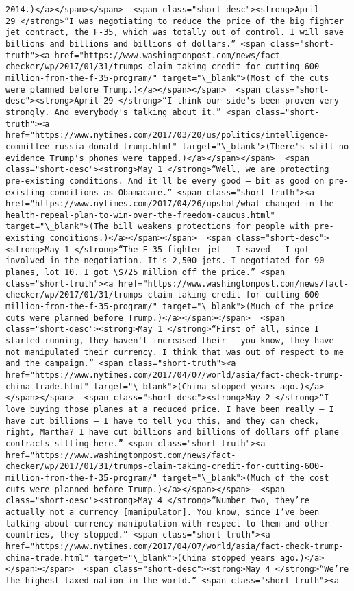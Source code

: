 \documentclass[11pt]{article}
\begin{document}
\begin{Verbatim}[commandchars=\\\{\}]
2014.)</a></span></span>  <span class="short-desc"><strong>April 29 </strong>“I was negotiating to reduce the price of the big fighter jet contract, the F-35, which was totally out of control. I will save billions and billions and billions of dollars.” <span class="short-truth"><a href="https://www.washingtonpost.com/news/fact-checker/wp/2017/01/31/trumps-claim-taking-credit-for-cutting-600-million-from-the-f-35-program/" target="\_blank">(Most of the cuts were planned before Trump.)</a></span></span>  <span class="short-desc"><strong>April 29 </strong>“I think our side's been proven very strongly. And everybody's talking about it.” <span class="short-truth"><a href="https://www.nytimes.com/2017/03/20/us/politics/intelligence-committee-russia-donald-trump.html" target="\_blank">(There's still no evidence Trump's phones were tapped.)</a></span></span>  <span class="short-desc"><strong>May 1 </strong>“Well, we are protecting pre-existing conditions. And it'll be every good — bit as good on pre-existing conditions as Obamacare.” <span class="short-truth"><a href="https://www.nytimes.com/2017/04/26/upshot/what-changed-in-the-health-repeal-plan-to-win-over-the-freedom-caucus.html" target="\_blank">(The bill weakens protections for people with pre-existing conditions.)</a></span></span>  <span class="short-desc"><strong>May 1 </strong>“The F-35 fighter jet — I saved — I got involved in the negotiation. It's 2,500 jets. I negotiated for 90 planes, lot 10. I got \$725 million off the price.” <span class="short-truth"><a href="https://www.washingtonpost.com/news/fact-checker/wp/2017/01/31/trumps-claim-taking-credit-for-cutting-600-million-from-the-f-35-program/" target="\_blank">(Much of the price cuts were planned before Trump.)</a></span></span>  <span class="short-desc"><strong>May 1 </strong>“First of all, since I started running, they haven't increased their — you know, they have not manipulated their currency. I think that was out of respect to me and the campaign.” <span class="short-truth"><a href="https://www.nytimes.com/2017/04/07/world/asia/fact-check-trump-china-trade.html" target="\_blank">(China stopped years ago.)</a></span></span>  <span class="short-desc"><strong>May 2 </strong>“I love buying those planes at a reduced price. I have been really — I have cut billions — I have to tell you this, and they can check, right, Martha? I have cut billions and billions of dollars off plane contracts sitting here.” <span class="short-truth"><a href="https://www.washingtonpost.com/news/fact-checker/wp/2017/01/31/trumps-claim-taking-credit-for-cutting-600-million-from-the-f-35-program/" target="\_blank">(Much of the cost cuts were planned before Trump.)</a></span></span>  <span class="short-desc"><strong>May 4 </strong>“Number two, they’re actually not a currency [manipulator]. You know, since I’ve been talking about currency manipulation with respect to them and other countries, they stopped.” <span class="short-truth"><a href="https://www.nytimes.com/2017/04/07/world/asia/fact-check-trump-china-trade.html" target="\_blank">(China stopped years ago.)</a></span></span>  <span class="short-desc"><strong>May 4 </strong>“We’re the highest-taxed nation in the world.” <span class="short-truth"><a 
\end{Verbatim}
\end{document}
